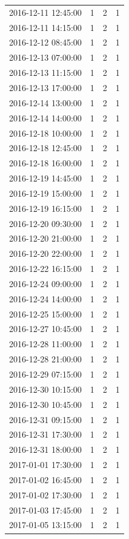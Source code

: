 \begin{tabular}{lrrr}
2016-12-11 12:45:00 & 1 & 2 & 1 \\
2016-12-11 14:15:00 & 1 & 2 & 1 \\
2016-12-12 08:45:00 & 1 & 2 & 1 \\
2016-12-13 07:00:00 & 1 & 2 & 1 \\
2016-12-13 11:15:00 & 1 & 2 & 1 \\
2016-12-13 17:00:00 & 1 & 2 & 1 \\
2016-12-14 13:00:00 & 1 & 2 & 1 \\
2016-12-14 14:00:00 & 1 & 2 & 1 \\
2016-12-18 10:00:00 & 1 & 2 & 1 \\
2016-12-18 12:45:00 & 1 & 2 & 1 \\
2016-12-18 16:00:00 & 1 & 2 & 1 \\
2016-12-19 14:45:00 & 1 & 2 & 1 \\
2016-12-19 15:00:00 & 1 & 2 & 1 \\
2016-12-19 16:15:00 & 1 & 2 & 1 \\
2016-12-20 09:30:00 & 1 & 2 & 1 \\
2016-12-20 21:00:00 & 1 & 2 & 1 \\
2016-12-20 22:00:00 & 1 & 2 & 1 \\
2016-12-22 16:15:00 & 1 & 2 & 1 \\
2016-12-24 09:00:00 & 1 & 2 & 1 \\
2016-12-24 14:00:00 & 1 & 2 & 1 \\
2016-12-25 15:00:00 & 1 & 2 & 1 \\
2016-12-27 10:45:00 & 1 & 2 & 1 \\
2016-12-28 11:00:00 & 1 & 2 & 1 \\
2016-12-28 21:00:00 & 1 & 2 & 1 \\
2016-12-29 07:15:00 & 1 & 2 & 1 \\
2016-12-30 10:15:00 & 1 & 2 & 1 \\
2016-12-30 10:45:00 & 1 & 2 & 1 \\
2016-12-31 09:15:00 & 1 & 2 & 1 \\
2016-12-31 17:30:00 & 1 & 2 & 1 \\
2016-12-31 18:00:00 & 1 & 2 & 1 \\
2017-01-01 17:30:00 & 1 & 2 & 1 \\
2017-01-02 16:45:00 & 1 & 2 & 1 \\
2017-01-02 17:30:00 & 1 & 2 & 1 \\
2017-01-03 17:45:00 & 1 & 2 & 1 \\
2017-01-05 13:15:00 & 1 & 2 & 1 \\

\end{tabular}
